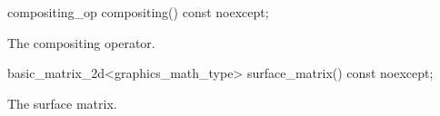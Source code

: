 %
\begin{itemdecl}
compositing_op compositing() const noexcept;
\end{itemdecl}
\begin{itemdescr}
\pnum
\returns
The compositing operator.
\end{itemdescr}

%
\begin{itemdecl}
basic_matrix_2d<graphics_math_type> surface_matrix() const noexcept;
\end{itemdecl}
\begin{itemdescr}
\pnum
\returns
The surface matrix.
\end{itemdescr}
